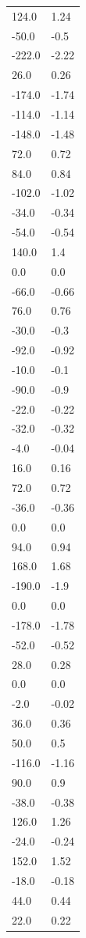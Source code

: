 \begin{longtable}{ll}
124.0 & 1.24 \\
-50.0 & -0.5 \\
-222.0 & -2.22 \\
26.0 & 0.26 \\
-174.0 & -1.74 \\
-114.0 & -1.14 \\
-148.0 & -1.48 \\
72.0 & 0.72 \\
84.0 & 0.84 \\
-102.0 & -1.02 \\
-34.0 & -0.34 \\
-54.0 & -0.54 \\
140.0 & 1.4 \\
0.0 & 0.0 \\
-66.0 & -0.66 \\
76.0 & 0.76 \\
-30.0 & -0.3 \\
-92.0 & -0.92 \\
-10.0 & -0.1 \\
-90.0 & -0.9 \\
-22.0 & -0.22 \\
-32.0 & -0.32 \\
-4.0 & -0.04 \\
16.0 & 0.16 \\
72.0 & 0.72 \\
-36.0 & -0.36 \\
0.0 & 0.0 \\
94.0 & 0.94 \\
168.0 & 1.68 \\
-190.0 & -1.9 \\
0.0 & 0.0 \\
-178.0 & -1.78 \\
-52.0 & -0.52 \\
28.0 & 0.28 \\
0.0 & 0.0 \\
-2.0 & -0.02 \\
36.0 & 0.36 \\
50.0 & 0.5 \\
-116.0 & -1.16 \\
90.0 & 0.9 \\
-38.0 & -0.38 \\
126.0 & 1.26 \\
-24.0 & -0.24 \\
152.0 & 1.52 \\
-18.0 & -0.18 \\
44.0 & 0.44 \\
22.0 & 0.22 \\

\end{longtable}

